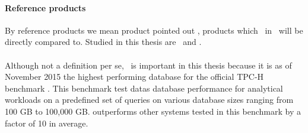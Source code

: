\paragraph{Reference products}
\label{par:Reference products}
By reference products we mean product pointed out \genus, products which \bd~in \genusSoftware~will be directly compared to. Studied in this thesis are \qlikview~and \tableau.


\paragraph{\exasol}
\label{par:exasol}
Although not a definition per se, \exasol~is important in this thesis because it is as of November 2015 the highest performing database for the official TPC-H benchmark \cite{noauthor_undated-vr}. This benchmark test datas database performance for analytical workloads on a predefined set of queries on various database sizes ranging from 100 GB to 100,000 GB. \exasol outperforms other systems tested in this benchmark by a factor of 10 in average.




